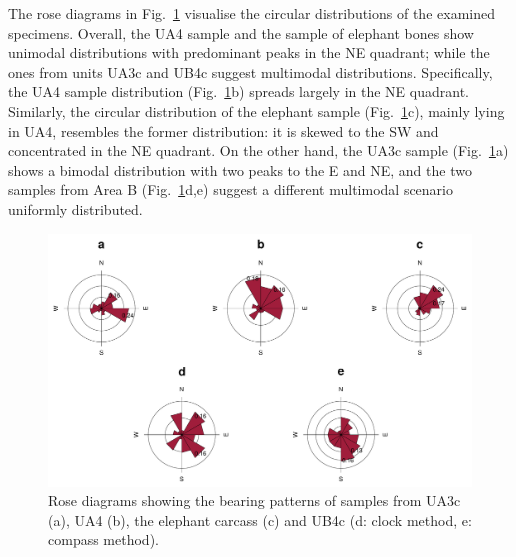 \documentclass[preprint,authoryear,times]{elsarticle} %
\begin{document}

The rose diagrams in Fig.~\ref{fig:6} visualise the circular distributions of the examined specimens. Overall, the UA4 sample and the sample of elephant bones show unimodal distributions with predominant peaks in the NE quadrant; while the ones from units UA3c and UB4c suggest multimodal distributions. Specifically, the UA4 sample distribution (Fig.~\ref{fig:6}b) spreads largely in the NE quadrant. Similarly, the circular distribution of the elephant sample (Fig.~\ref{fig:6}c), mainly lying in UA4, resembles the former distribution: it is skewed to the SW and concentrated in the NE quadrant. On the other hand, the UA3c sample (Fig.~\ref{fig:6}a) shows a bimodal distribution with two peaks to the E and NE, and the two samples from Area B (Fig.~\ref{fig:6}d,e) suggest a different multimodal scenario uniformly distributed.

\begin{figure}[]
  \centering
  \includegraphics[width=1\textwidth]{./artwork/Fig6.pdf}
  \caption{Rose diagrams showing the bearing patterns of samples from UA3c (a), UA4 (b), the elephant carcass (c) and UB4c (d: clock method, e: compass method).}
  \label{fig:6}
\end{figure}
\end{document}
